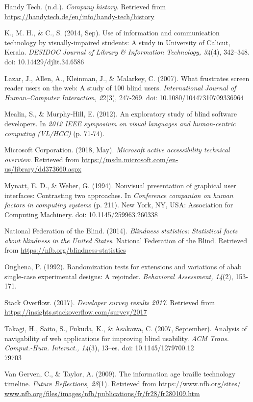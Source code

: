 \documentclass[11.5pt]{sig-alternate} %
\begin{document}
Handy Tech. (n.d.). \textit{Company history}. Retrieved from \url{https://handytech.de/en/info/handy-tech/history}

K., M. H., \& C., S. (2014, Sep). Use of information and communication technology by visually-impaired students: A study in University of Calicut, Kerala. \textit{DESIDOC Journal of Library \& Information Technology, 34}(4), 342–348. doi: 10.14429/djlit.34.6586

Lazar, J., Allen, A., Kleinman, J., \& Malarkey, C. (2007). What frustrates screen reader users on the web: A study of 100 blind users. \textit{International Journal of Human–Computer Interaction, 2}2(3), 247-269. doi: 10.1080/10447310709336964 

Mealin, S., \& Murphy-Hill, E. (2012). An exploratory study of blind software developers. In \textit{2012 IEEE symposium on visual languages and human-centric computing (VL/HCC)} (p. 71-74).

Microsoft Corporation. (2018, May). \textit{Microsoft active accessibility technical overview}. Retrieved from \url{https://msdn.microsoft.com/en-us/library/dd373660.aspx}

Mynatt, E. D., \& Weber, G. (1994). Nonvisual presentation of graphical user interfaces: Contrasting two approaches. In \textit{Conference companion on human factors in computing system}s (p. 211). New York, NY, USA: Association for Computing Machinery. doi: 10.1145/259963.260338

National Federation of the Blind. (2014). \textit{Blindness statistics: Statistical facts about blindness in the United States}. National Federation of the Blind. Retrieved from \url{https://nfb.org/blindness-statistics}

Onghena, P. (1992). Randomization tests for extensions and variations of abab single-case experimental designs: A rejoinder. \textit{Behavioral Assessment, 14}(2), 153-171.

Stack Overflow. (2017). \textit{Developer survey results 2017}. Retrieved from \url{https://insights.stackoverflow.com/survey/2017}

Takagi, H., Saito, S., Fukuda, K., \& Asakawa, C. (2007, September). Analysis of navigability of web applications for improving blind usability. \textit{ACM Trans. Comput.-Hum. Interact., 14}(3), 13–es. doi: 10.1145/1279700.12\\79703

Van Gerven, C., \& Taylor, A. (2009). The information age braille technology timeline. \textit{Future Reflections, 28}(1). Retrieved from \url{https://www.nfb.org/sites/} \url{www.nfb.org/files/images/nfb/publications/fr/fr28/fr280109.htm}
\end{document}
